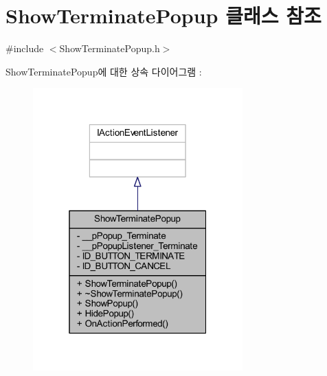 \hypertarget{class_show_terminate_popup}{\section{Show\+Terminate\+Popup 클래스 참조}
\label{class_show_terminate_popup}
}


{\ttfamily \#include $<$Show\+Terminate\+Popup.\+h$>$}



Show\+Terminate\+Popup에 대한 상속 다이어그램 \+: 
\nopagebreak
\begin{figure}[H]
\begin{center}
\leavevmode
\includegraphics[width=229pt]{class_show_terminate_popup__inherit__graph}
\end{center}
\end{figure}


